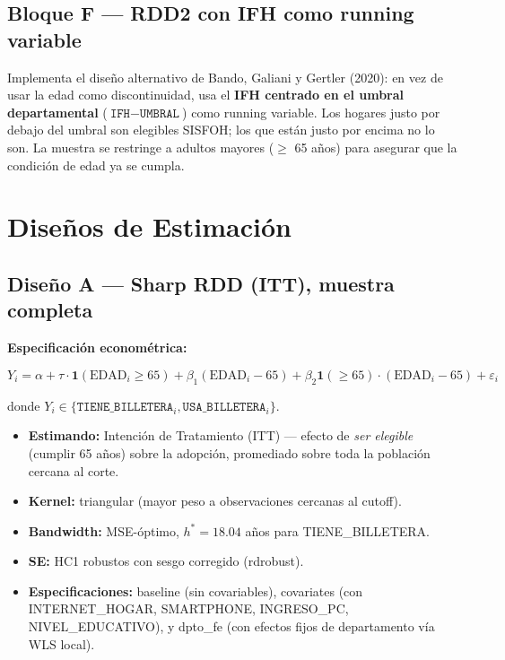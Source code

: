 \documentclass[12pt, a4paper]{article}
\begin{document}
\subsection{Bloque F — RDD2 con IFH como running variable}

Implementa el diseño alternativo de Bando, Galiani y Gertler (2020): en
vez de usar la edad como discontinuidad, usa el \textbf{IFH centrado en el
umbral departamental} ($\texttt{IFH} - \texttt{UMBRAL}$) como running
variable. Los hogares justo por debajo del umbral son elegibles SISFOH;
los que están justo por encima no lo son. La muestra se restringe a
adultos mayores ($\geq$ 65 años) para asegurar que la condición de edad
ya se cumpla.

\section{Diseños de Estimación}

\subsection{Diseño A — Sharp RDD (ITT), muestra completa}

\textbf{Especificación econométrica:}

$$Y_i = \alpha + \tau \cdot \mathbf{1}(\text{EDAD}_i \geq 65) + \beta_1 (\text{EDAD}_i - 65) + \beta_2 \mathbf{1}(\geq 65) \cdot (\text{EDAD}_i - 65) + \varepsilon_i$$

donde $Y_i \in \{\texttt{TIENE\_BILLETERA}_i, \texttt{USA\_BILLETERA}_i\}$.

\begin{itemize}[noitemsep]
  \item \textbf{Estimando:} Intención de Tratamiento (ITT) --- efecto de
    \textit{ser elegible} (cumplir 65 años) sobre la adopción, promediado
    sobre toda la población cercana al corte.
  \item \textbf{Kernel:} triangular (mayor peso a observaciones cercanas al cutoff).
  \item \textbf{Bandwidth:} MSE-óptimo, $h^* = 18.04$ años para TIENE\_BILLETERA.
  \item \textbf{SE:} HC1 robustos con sesgo corregido (rdrobust).
  \item \textbf{Especificaciones:} baseline (sin covariables), covariates
    (con INTERNET\_HOGAR, SMARTPHONE, INGRESO\_PC, NIVEL\_EDUCATIVO), y
    dpto\_fe (con efectos fijos de departamento vía WLS local).
\end{itemize}
\end{document}
